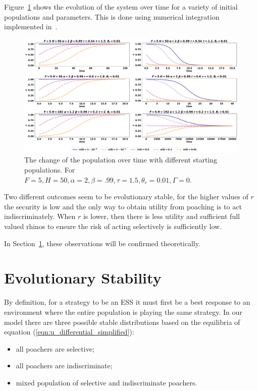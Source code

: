 \documentclass[10pt]{article}
\begin{document}
Figure~\ref{fig:evolution_of_system} shows the evolution of the system over time
for a variety of initial populations and parameters.
This is done using numerical integration implemented  in~\cite{scipy}.

\begin{figure}[!htbp]
    \includegraphics[width=\textwidth]{images/evolution_of_system.pdf}
    \caption{\label{fig:evolution_of_system} The change of the population over
    time with different starting populations. For \(F=5, H=50,
    \alpha=2, \beta=.99, \tau=1.5, \theta_r=0.01, \Gamma=0\).}
\end{figure}

Two different outcomes seem to be evolutionary stable, for the higher values
of \(r\) the security is low and the only way to obtain utility from poaching is
to act indiscriminately. When \(r\) is lower, then there is less utility and
sufficient full valued rhinos to ensure the risk of acting selectively is
sufficiently low.

In Section~\ref{section:evolutionary_stability}, these observations will be
confirmed theoretically.

\section{Evolutionary Stability}\label{section:evolutionary_stability}

By definition, for a strategy to be an ESS it must first be a best response to an
environment where the entire population is playing the same strategy.
In our model there are three possible stable distributions based on the
equilibria of equation (\ref{eqn:u_differential_simplified}):

\begin{itemize}
    \item all poachers are selective;
    \item all poachers are indiscriminate;
    \item mixed population of selective and indiscriminate poachers.
\end{itemize}
\end{document}
